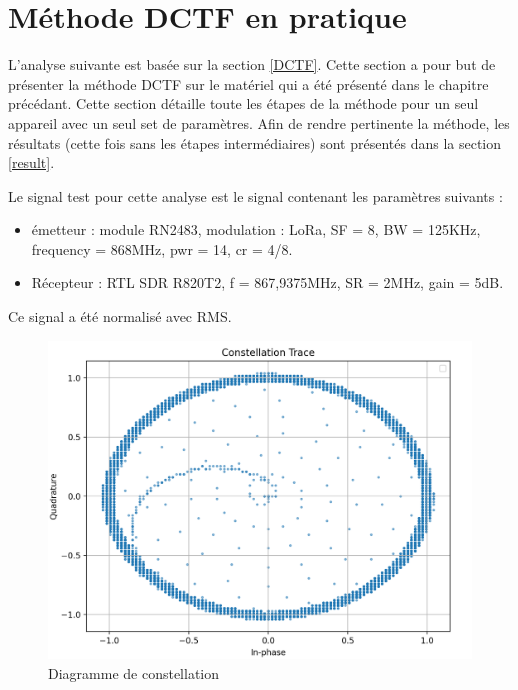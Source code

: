  
\section{Méthode DCTF en pratique}\label{pra}

L'analyse suivante est basée sur la section \ref{DCTF}. Cette section a pour but de présenter la méthode DCTF sur le matériel qui a été présenté dans le chapitre précédant. Cette section détaille toute les étapes de la méthode pour un seul appareil avec un seul set de paramètres. Afin de rendre pertinente la méthode, les résultats (cette fois sans les étapes intermédiaires) sont présentés dans la section \ref{result}.

Le signal test pour cette analyse est le signal contenant les paramètres suivants :

\vspace{0.1cm}

\begin{itemize}
\item émetteur : module RN2483, modulation : LoRa, SF = 8, BW = 125KHz, frequency = 868MHz, pwr = 14, cr = 4/8.
\item Récepteur : RTL SDR R820T2, f = 867,9375MHz, SR = 2MHz, gain = 5dB.
\end{itemize}

\vspace{0.1cm}

Ce signal a été normalisé avec RMS.

\begin{figure}[h]
\centering

\includegraphics[scale=0.25]{images/dctf1.png}
\caption{Diagramme de constellation}\label{term314}
\end{figure}



